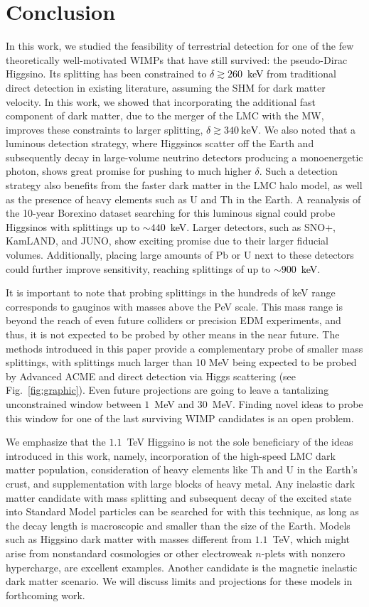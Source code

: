 \documentclass[aps,prd,amsmath,amssymb,10pt,letterpaper,balancelastpage,showpacs,superscriptaddress,nofootinbib,floatfix,notitlepage,longbibliography,twocolumn
]{revtex4-2}
\newcommand{\numcolor}[1]{\textcolor{black}{#1}}
\begin{document}
\section{Conclusion}
In this work, we studied the feasibility of terrestrial detection for one of the few theoretically well-motivated WIMPs that have still survived: the pseudo-Dirac Higgsino. Its splitting has been constrained to \numcolor{$\delta \gtrsim 260$~keV} from traditional direct detection in existing literature, assuming the SHM for dark matter velocity. In this work, we showed that incorporating the additional fast component of dark matter, due to the merger of the LMC with the MW, improves these constraints to larger splitting, \numcolor{$\delta \gtrsim 340~\textrm{keV}$}.  We also noted that a luminous detection strategy, where Higgsinos scatter off the Earth and subsequently decay in large-volume neutrino detectors producing a monoenergetic photon, shows great promise for pushing to much higher $\delta$.
Such a detection strategy also benefits from the faster dark matter in the LMC halo model, as well as the presence of heavy elements such as U and Th in the Earth.
A reanalysis of the 10-year Borexino dataset searching for this luminous signal could probe Higgsinos with splittings up to \numcolor{$\sim 440$~keV}.  Larger detectors, such as SNO+, KamLAND, and JUNO, show exciting promise due to their larger fiducial volumes. Additionally, placing large amounts of Pb or U next to these detectors could further improve sensitivity, reaching splittings of up to \numcolor{$\sim 900$~keV}.

It is important to note that probing splittings in the hundreds of keV range corresponds to gauginos with masses above the PeV scale. This mass range is beyond the reach of even future colliders or precision EDM experiments, and thus, it is not expected to be probed by other means in the near future. The methods introduced in this paper provide a complementary probe of smaller mass splittings, with splittings much larger than 10 MeV being expected to be probed by Advanced ACME and direct detection via Higgs scattering (see Fig.~\ref{fig:graphic}). Even future projections are going to leave a tantalizing unconstrained window between $1$~MeV and $30$~MeV. Finding novel ideas to probe this window for one of the last surviving WIMP candidates is an open problem.  

We emphasize that the $1.1$~TeV Higgsino is not the sole beneficiary of the ideas introduced in this work, namely, incorporation of the high-speed LMC dark matter population, consideration of heavy elements like Th and U in the Earth's crust, and supplementation with large blocks of heavy metal. Any inelastic dark matter candidate with mass splitting and subsequent decay of the excited state into Standard Model particles can be searched for with this technique, as long as the decay length is macroscopic and smaller than the size of the Earth. Models such as Higgsino dark matter with masses different from $1.1$~TeV, which might arise from nonstandard cosmologies or other electroweak $n$-plets with nonzero hypercharge, are excellent examples. Another candidate is the magnetic inelastic dark matter scenario. We will discuss limits and projections for these models in forthcoming work. 
\end{document}
